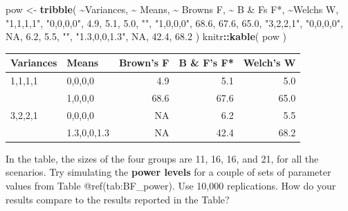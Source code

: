 \documentclass[
]{book}
\newenvironment{Shaded}{\begin{snugshade}}{\end{snugshade}}
\newcommand{\AttributeTok}[1]{\textcolor[rgb]{0.13,0.29,0.53}{#1}}
\newcommand{\ConstantTok}[1]{\textcolor[rgb]{0.56,0.35,0.01}{#1}}
\newcommand{\FloatTok}[1]{\textcolor[rgb]{0.00,0.00,0.81}{#1}}
\newcommand{\FunctionTok}[1]{\textcolor[rgb]{0.13,0.29,0.53}{\textbf{#1}}}
\newcommand{\NormalTok}[1]{#1}
\newcommand{\OtherTok}[1]{\textcolor[rgb]{0.56,0.35,0.01}{#1}}
\newcommand{\SpecialCharTok}[1]{\textcolor[rgb]{0.81,0.36,0.00}{\textbf{#1}}}
\newcommand{\StringTok}[1]{\textcolor[rgb]{0.31,0.60,0.02}{#1}}
\begin{document}
\begin{Shaded}
\begin{Highlighting}[]
\NormalTok{pow }\OtherTok{\textless{}{-}} \FunctionTok{tribble}\NormalTok{( }\SpecialCharTok{\textasciitilde{}}\NormalTok{Variances, }\SpecialCharTok{\textasciitilde{}}\NormalTok{ Means, }\SpecialCharTok{\textasciitilde{}} \StringTok{\textasciigrave{}}\AttributeTok{Brown\textquotesingle{}s F}\StringTok{\textasciigrave{}}\NormalTok{, }\SpecialCharTok{\textasciitilde{}} \StringTok{\textasciigrave{}}\AttributeTok{B \& F\textquotesingle{}s F*}\StringTok{\textasciigrave{}}\NormalTok{, }\SpecialCharTok{\textasciitilde{}}\StringTok{\textasciigrave{}}\AttributeTok{Welch\textquotesingle{}s W}\StringTok{\textasciigrave{}}\NormalTok{,}
                \StringTok{"1,1,1,1"}\NormalTok{,   }\StringTok{"0,0,0,0"}\NormalTok{, }\FloatTok{4.9}\NormalTok{, }\FloatTok{5.1}\NormalTok{, }\FloatTok{5.0}\NormalTok{,}
                \StringTok{""}\NormalTok{,          }\StringTok{"1,0,0,0"}\NormalTok{, }\FloatTok{68.6}\NormalTok{, }\FloatTok{67.6}\NormalTok{, }\FloatTok{65.0}\NormalTok{,}
                \StringTok{"3,2,2,1"}\NormalTok{,   }\StringTok{"0,0,0,0"}\NormalTok{,  }\ConstantTok{NA}\NormalTok{, }\FloatTok{6.2}\NormalTok{, }\FloatTok{5.5}\NormalTok{, }
                \StringTok{""}\NormalTok{,         }\StringTok{"1.3,0,0,1.3"}\NormalTok{, }\ConstantTok{NA}\NormalTok{, }\FloatTok{42.4}\NormalTok{, }\FloatTok{68.2}
\NormalTok{                )}
\NormalTok{knitr}\SpecialCharTok{::}\FunctionTok{kable}\NormalTok{( pow )}
\end{Highlighting}
\end{Shaded}

\begin{tabular}{l|l|r|r|r}
\hline
Variances & Means & Brown's F & B \& F's F* & Welch's W\\
\hline
1,1,1,1 & 0,0,0,0 & 4.9 & 5.1 & 5.0\\
\hline
 & 1,0,0,0 & 68.6 & 67.6 & 65.0\\
\hline
3,2,2,1 & 0,0,0,0 & NA & 6.2 & 5.5\\
\hline
 & 1.3,0,0,1.3 & NA & 42.4 & 68.2\\
\hline
\end{tabular}

In the table, the sizes of the four groups are 11, 16, 16, and 21, for all the scenarios.
Try simulating the \textbf{power levels} for a couple of sets of parameter values from Table @ref(tab:BF\_power). Use 10,000 replications. How do your results compare to the results reported in the Table?
\end{document}
